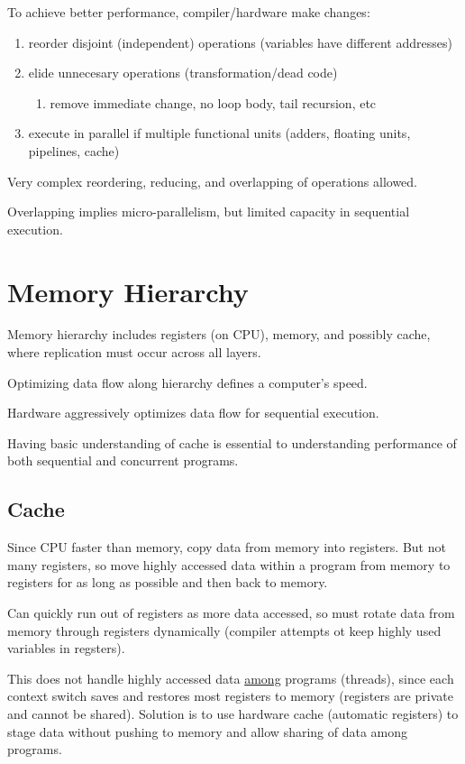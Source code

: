 \documentclass[11pt]{article}
\begin{document}
To achieve better performance, compiler/hardware make changes:
\begin{enumerate}
\item reorder disjoint (independent) operations (variables have different addresses)
\item elide unnecesary operations (transformation/dead code)
\begin{enumerate}
\item remove immediate change, no loop body, tail recursion, etc
\end{enumerate}
\item execute in parallel if multiple functional units (adders, floating units, pipelines, cache)
\end{enumerate}

Very complex reordering, reducing, and overlapping of operations allowed.

Overlapping implies micro-parallelism, but limited capacity in sequential execution.
\section{Memory Hierarchy}
\label{sec:org05be5c9}
Memory hierarchy includes registers (on CPU), memory, and possibly cache, where replication
must occur across all layers.

Optimizing data flow along hierarchy defines a computer's speed.

Hardware aggressively optimizes data flow for sequential execution.

Having basic understanding of cache is essential to understanding performance of both sequential
and concurrent programs.
\subsection{Cache}
\label{sec:org6e71138}
Since CPU faster than memory, copy data from memory into registers.
But not many registers, so move highly accessed data within a program from memory to registers
for as long as possible and then back to memory.

Can quickly run out of registers as more data accessed, so must rotate data from memory through
registers dynamically (compiler attempts ot keep highly used variables in regsters).

This does not handle highly accessed data \uline{among} programs (threads), since each context switch
saves and restores most registers to memory (registers are private and cannot be shared).
Solution is to use hardware cache (automatic registers) to stage data without pushing to memory
and allow sharing of data among programs.
\end{document}
